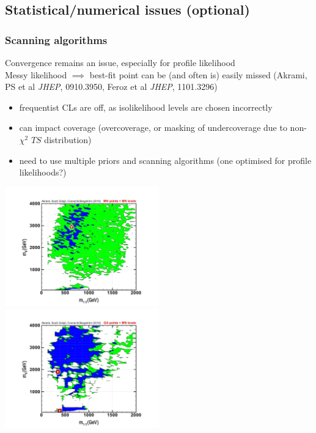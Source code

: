 \documentclass[xcolor=dvipsnames]{beamer}
\newcommand{\cblue}[1]{{\color[rgb]{0.1, 0.0, 0.6} #1}}
\begin{document}
\subsection[Statistical/numerical issues \bf(optional)]{Statistical/numerical issues \bf(optional)}

\begin{frame}
\frametitle{Scanning algorithms}

\cblue{Convergence remains an issue, especially for profile likelihood}\\
Messy likelihood $\implies$ best-fit point can be (and often is) easily missed {\tiny(Akrami, PS et al {\it JHEP}, 0910.3950, Feroz et al {\it JHEP}, 1101.3296)}
      \begin{itemize}\footnotesize
                 \item frequentist CLs are off, as isolikelihood levels are chosen incorrectly
                 \item can impact coverage (overcoverage, or masking of undercoverage due to non-$\chi^2$ $TS$ distribution)
                 \item need to use multiple priors and scanning algorithms (one optimised for profile likelihoods?)  
      \end{itemize}\vspace{-2mm}
\includegraphics[width=0.5\textwidth]{MN_m0mhf_MNlevels}	
\includegraphics[width=0.5\textwidth]{GA_m0mhf_MNlevels}	


\end{frame}
\end{document}
